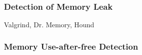 \subsubsection{Detection of Memory Leak}

Valgrind, Dr. Memory, 
Hound

\subsubsection{Memory Use-after-free Detection}

\begin{comment} 
A lot of  tools utilize the binary instrumentations, such as
Valgrind~\cite{overflow:valgrind}, Purify~\cite{overflow:purify}, 
Dr. Memory~\cite{overflow:drmemory}, 
Inspector~\cite{overflow:inspector} and Discover~\cite{overflow:discover}.


 Mudflap~\cite{overflow:Mudflap}
and AddressSanitizer~\cite{AddressSanitizer}.

However, AddressSanitizer can not detect the problems caused by library calls and partial 
out-of-bounds error caused by an unaligned access. 
The performance overhead of AddressSanitizer is still significant: average 26\% slowdown if writes are
instrumented only and 73\% slowdown if all acccesses are instrumented.
\end{comment}

\begin{comment}
CCured~\cite{overflow:ccured} and LBC~\cite{overflow:lbc} uses static analysis to reduce 
redundant checks and reduce the overhead of instrumentation. They can only limited to C language
and can not detect the usage-after-free memory errors. LBC performance overhead are higher than
23\% averagely, even with the help of static analysis. 
In order to reduce the overhead, LBC do not check pointer arithmetic operations, but only on pointer
dereferences. This could cause some false negatives, which those overflow is caused by pointer arithmetic operations. 
LBC is very impressive in its memory overhead, only 8.3\% overhead.
LBC do not given any details whether they detect those out-of-bounds errors in their most efficient
mode or not, since this can be misleading because different mode have significant difference on performance.

Baggy~\cite{overflow:Baggy} and WIT~\cite{overflow:WIT}.

\end{comment}

